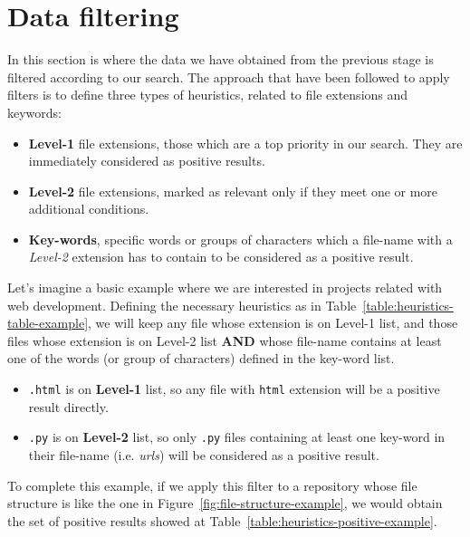 \documentclass[a4paper, 12pt]{book}
\begin{document}
\section{Data filtering}
\label{sec:data-filtering}

In this section is where the data we have obtained from the previous stage is filtered according to our search.
The approach that have been followed to apply filters is to define three types of heuristics, related to
file extensions and keywords:

\begin{itemize}
  \item \textbf{Level-1} file extensions, those which are a top priority in our search. They are immediately considered
   as positive results.
  \item \textbf{Level-2} file extensions, marked as relevant only if they meet one or more additional conditions.
  \item \textbf{Key-words}, specific words or groups of characters which a file-name with a \textit{Level-2} extension
  has to contain to be considered as a positive result.
\end{itemize}

Let's imagine a basic example where we are interested in projects related with web development. Defining the
necessary heuristics as in Table~\ref{table:heuristics-table-example}, we will keep any file whose extension
is on Level-1 list, and those files whose extension is on Level-2 list \textbf{AND} whose file-name contains at least one
of the words (or group of characters) defined in the key-word list.

\begin{itemize}
  \item \texttt{.html} is on \textbf{Level-1} list, so any file with \texttt{html} extension will be a positive result directly.
  \item \texttt{.py} is on \textbf{Level-2} list, so only \texttt{.py} files containing at least one key-word in their file-name
  (i.e. \textit{urls}) will be considered as a positive result.
\end{itemize}

To complete this example, if we apply this filter to a repository whose file structure is like the one in Figure~\ref{fig:file-structure-example},
we would obtain the set of positive results showed at Table~\ref{table:heuristics-positive-example}.
\end{document}
